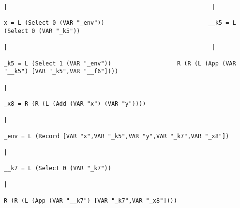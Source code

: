 \begin{landscape}
\begin{lstlisting}[basicstyle=\fontsize{4.5}{5.5}\selectfont\ttfamily]
                                                                                                                                  |                                                           |
                                                                                                                    x = L (Select 0 (VAR "_env"))                              __k5 = L (Select 0 (VAR "_k5"))
                                                                                                                                  |                                                           |
                                                                                                                   _k5 = L (Select 1 (VAR "_env"))                   R (R (L (App (VAR "__k5") [VAR "_k5",VAR "__f6"])))
                                                                                                                                  |
                                                                                                              _x8 = R (R (L (Add (VAR "x") (VAR "y"))))
                                                                                                                                  |
                                                                                                  _env = L (Record [VAR "x",VAR "_k5",VAR "y",VAR "_k7",VAR "_x8"])
                                                                                                                                  |
                                                                                                                   __k7 = L (Select 0 (VAR "_k7"))
                                                                                                                                  |
                                                                                                          R (R (L (App (VAR "__k7") [VAR "_k7",VAR "_x8"])))

\end{lstlisting}
\end{landscape}
\clearpage

